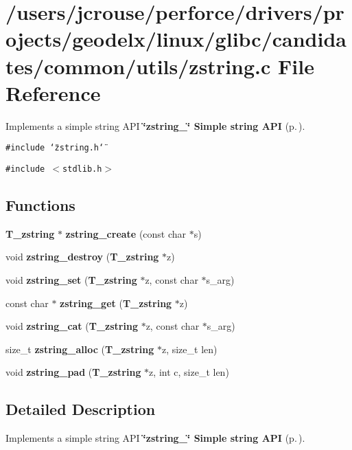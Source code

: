 \section{/users/jcrouse/perforce/drivers/projects/geodelx/linux/glibc/candidates/common/utils/zstring.c File Reference}
\label{zstring_8c}
Implements a simple string API {\bf \char`\"{}zstring\_\-\char`\"{} Simple string API} {\rm (p.\,\pageref{group__zstring})}. 


{\tt \#include \char`\"{}zstring.h\char`\"{}}\par
{\tt \#include $<$stdlib.h$>$}\par
\subsection*{Functions}
\begin{CompactItemize}
\item 
{\bf T\_\-zstring} $\ast$ {\bf zstring\_\-create} (const char $\ast$s)
\item 
void {\bf zstring\_\-destroy} ({\bf T\_\-zstring} $\ast$z)
\item 
void {\bf zstring\_\-set} ({\bf T\_\-zstring} $\ast$z, const char $\ast$s\_\-arg)
\item 
const char $\ast$ {\bf zstring\_\-get} ({\bf T\_\-zstring} $\ast$z)
\item 
void {\bf zstring\_\-cat} ({\bf T\_\-zstring} $\ast$z, const char $\ast$s\_\-arg)
\item 
size\_\-t {\bf zstring\_\-alloc} ({\bf T\_\-zstring} $\ast$z, size\_\-t len)
\item 
void {\bf zstring\_\-pad} ({\bf T\_\-zstring} $\ast$z, int c, size\_\-t len)
\end{CompactItemize}


\subsection{Detailed Description}
Implements a simple string API {\bf \char`\"{}zstring\_\-\char`\"{} Simple string API} {\rm (p.\,\pageref{group__zstring})}.



